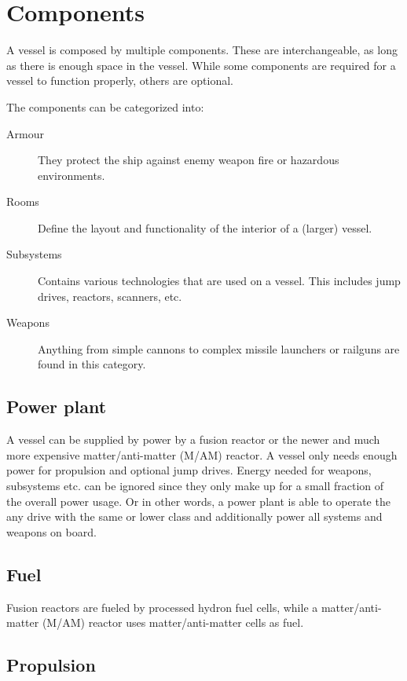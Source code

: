 \section{Components}
\label{sec:Components}

A vessel is composed by multiple components. These are interchangeable, as long as there is enough space in the vessel. While some components are required for a vessel to function properly, others are optional.

The components can be categorized into:
\begin{description}
  \item[Armour]
  They protect the ship against enemy weapon fire or hazardous environments.
  \item[Rooms]
  Define the layout and functionality of the interior of a (larger) vessel.
  \item[Subsystems]
  Contains various technologies that are used on a vessel. This includes jump drives, reactors, scanners, etc.
  \item[Weapons]
  Anything from simple cannons to complex missile launchers or railguns are found in this category.
\end{description}

\subsection{Power plant}

A vessel can be supplied by power by a fusion reactor or the newer and much more expensive matter/anti-matter (M/AM) reactor. A vessel only needs enough power for propulsion and optional jump drives. Energy needed for weapons, subsystems etc. can be ignored since they only make up for a small fraction of the overall power usage. Or in other words, a power plant is able to operate the any drive with the same or lower class and additionally power all systems and weapons on board.

\subsection{Fuel}
\label{sub:Fuel}

Fusion reactors are fueled by processed hydron fuel cells, while  a matter/anti-matter (M/AM) reactor uses matter/anti-matter cells as fuel.

\subsection{Propulsion}


